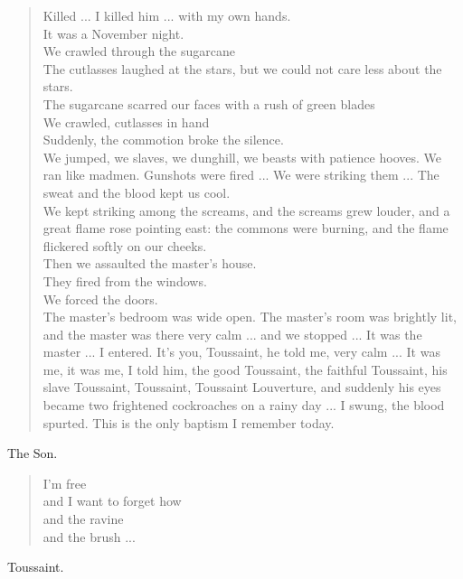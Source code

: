 \documentclass[letterpaper,article,12pt,oneside,notitlepage]{memoir}
\begin{document}
\begin{verse}
Killed ... I killed him ... with my own hands. \\
It was a November night. \\
We crawled through the sugarcane \\
The cutlasses laughed at the stars, but we could not care less about the stars. \\
The sugarcane scarred our faces with a rush of green blades \\
We crawled, cutlasses in hand \\
Suddenly, the commotion broke the silence. \\
We jumped, we slaves, we dunghill, we beasts with patience hooves. We ran like madmen. Gunshots were fired ... We were striking them ... The sweat and the blood kept us cool.  \\
We kept striking among the screams, and the screams grew louder, and a great flame rose pointing east: the commons were burning, and the flame flickered softly on our cheeks.  \\
Then we assaulted the master's house. \\
They fired from the windows. \\
We forced the doors. \\
The master's bedroom was wide open. The master's room was brightly lit, and the master was there very calm ... and we stopped ... It was the master ... I entered. It's you, Toussaint, he told me, very calm ... It was me, it was me, I told him, the good Toussaint, the faithful Toussaint, his slave Toussaint, Toussaint, Toussaint Louverture, and suddenly his eyes became two frightened cockroaches on a rainy day ... I swung, the blood spurted. This is the only baptism I remember today.  \\
\end{verse}

\begin{center}The Son.\end{center}

\begin{verse}
I'm free \\
and I want to forget how \\
and the ravine \\
and the brush ... \\
\end{verse}

\begin{center}Toussaint.\end{center}
\end{document}
